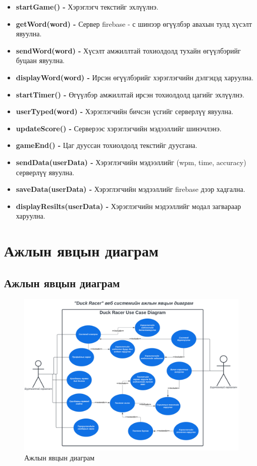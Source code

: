 \begin{itemize}
	\item \textbf{startGame() -} Хэрэглэгч текстийг эхлүүлнэ.
	\item \textbf{getWord(word) -} Сервер firebase - с шинээр өгүүлбэр авахын тулд хүсэлт явуулна.
	\item \textbf{sendWord(word) -} Хүсэлт амжиллтай тохиолдолд тухайн өгүүлбэрийг буцаан явуулна.
	\item \textbf{displayWord(word) -} Ирсэн өгүүлбэрийг хэрэглэгчийн дэлгэцэд харуулна. 
	\item \textbf{startTimer() -} Өгүүлбэр амжиллтай ирсэн тохиолдолд цагийг эхлүүлнэ. 
	\item \textbf{userTyped(word) -} Хэрэглэгчийн бичсэн үсгийг серверлүү явуулна.
	\item \textbf{updateScore() -} Серверээс хэрэглэгчийн мэдээллийг шинэчлэнэ.
	\item \textbf{gameEnd() -} Цаг дууссан тохиолдолд текстийг дуусгана.
	\item \textbf{sendData(userData) -}  Хэрэглэгчийн мэдээллийг (wpm, time, accuracy) серверлүү явуулна. 
	\item \textbf{saveData(userData) -} Хэрэглэгчийн мэдээллийг firebase дээр хадгална.
	\item \textbf{displayResilts(userData) -} Хэрэглэгчийн мэдээллийг модал загвараар харуулна.
\end{itemize}

\pagebreak

\section{Ажлын явцын диаграм}

\subsection{Ажлын явцын диаграм}
\begin{figure}[h]
	\centering
	\includegraphics[width=18cm]{images/usecase.png}
	\caption{Ажлын явцын диаграм}
	\label{fig:usecase}
\end{figure}

